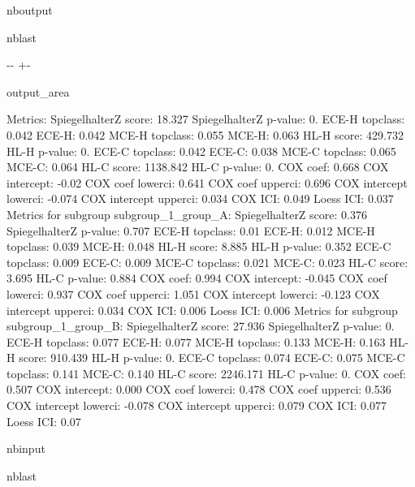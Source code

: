 \documentclass[letterpaper,10pt,english]{sphinxmanual}
\begin{document}
\begin{sphinxuseclass}{nboutput}
\begin{sphinxuseclass}{nblast}
{

\kern-\sphinxverbatimsmallskipamount\kern-\baselineskip
\kern+\FrameHeightAdjust\kern-\fboxrule
\vspace{\nbsphinxcodecellspacing}

\begin{sphinxuseclass}{output_area}
\begin{sphinxuseclass}{}


\begin{sphinxVerbatim}[commandchars=\\\{\}]
Metrics:
SpiegelhalterZ score: 18.327
SpiegelhalterZ p-value: 0.
ECE-H topclass: 0.042
ECE-H: 0.042
MCE-H topclass: 0.055
MCE-H: 0.063
HL-H score: 429.732
HL-H p-value: 0.
ECE-C topclass: 0.042
ECE-C: 0.038
MCE-C topclass: 0.065
MCE-C: 0.064
HL-C score: 1138.842
HL-C p-value: 0.
COX coef: 0.668
COX intercept: -0.02
COX coef lowerci: 0.641
COX coef upperci: 0.696
COX intercept lowerci: -0.074
COX intercept upperci: 0.034
COX ICI: 0.049
Loess ICI: 0.037
Metrics for subgroup subgroup\_1\_group\_A:
SpiegelhalterZ score: 0.376
SpiegelhalterZ p-value: 0.707
ECE-H topclass: 0.01
ECE-H: 0.012
MCE-H topclass: 0.039
MCE-H: 0.048
HL-H score: 8.885
HL-H p-value: 0.352
ECE-C topclass: 0.009
ECE-C: 0.009
MCE-C topclass: 0.021
MCE-C: 0.023
HL-C score: 3.695
HL-C p-value: 0.884
COX coef: 0.994
COX intercept: -0.045
COX coef lowerci: 0.937
COX coef upperci: 1.051
COX intercept lowerci: -0.123
COX intercept upperci: 0.034
COX ICI: 0.006
Loess ICI: 0.006
Metrics for subgroup subgroup\_1\_group\_B:
SpiegelhalterZ score: 27.936
SpiegelhalterZ p-value: 0.
ECE-H topclass: 0.077
ECE-H: 0.077
MCE-H topclass: 0.133
MCE-H: 0.163
HL-H score: 910.439
HL-H p-value: 0.
ECE-C topclass: 0.074
ECE-C: 0.075
MCE-C topclass: 0.141
MCE-C: 0.140
HL-C score: 2246.171
HL-C p-value: 0.
COX coef: 0.507
COX intercept: 0.000
COX coef lowerci: 0.478
COX coef upperci: 0.536
COX intercept lowerci: -0.078
COX intercept upperci: 0.079
COX ICI: 0.077
Loess ICI: 0.07
\end{sphinxVerbatim}



\end{sphinxuseclass}
\end{sphinxuseclass}
}

\end{sphinxuseclass}
\end{sphinxuseclass}
\begin{sphinxuseclass}{nbinput}
\begin{sphinxuseclass}{nblast}
{
\begin{sphinxVerbatim}[commandchars=\\\{\}]
\llap{\color{nbsphinxin}[ ]:\,\hspace{\fboxrule}\hspace{\fboxsep}}
\end{sphinxVerbatim}
}

\end{sphinxuseclass}
\end{sphinxuseclass}
\sphinxstepscope
\end{document}
